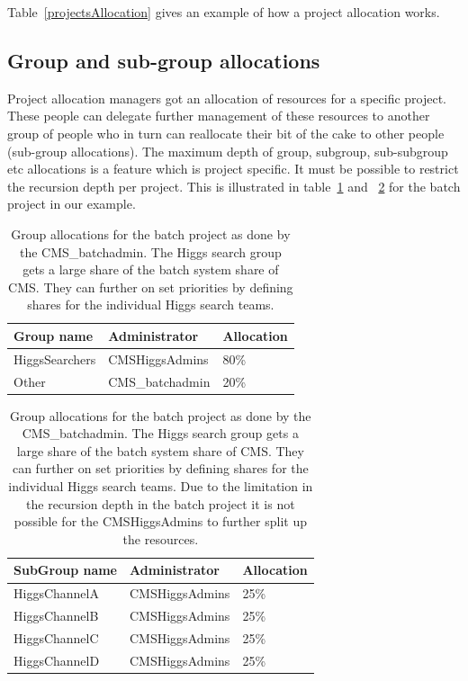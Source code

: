 Table~\ref{projectsAllocation} gives an example of how a project allocation works. 

\subsection{Group and sub-group allocations}
Project allocation managers got an allocation of resources for a specific project. These people can delegate further management of these resources to another group of people who in turn can reallocate their bit of the cake to other people (sub-group allocations). 
The maximum depth of group, subgroup, sub-subgroup etc allocations is a feature which is project specific. It must be possible to restrict the recursion depth per project. This is illustrated in table~\ref{groupAllocationForBatch} and ~\ref{subgroupAllocationForBatch} for the batch project in our example.

\begin{table}[htb]
\begin{center}
\begin{tabular}{|l|l|l|}
\hline
Group name & Administrator & Allocation \\
\hline
HiggsSearchers & CMSHiggsAdmins& 80\%\\
Other & CMS\_batchadmin & 20\%\\
\hline
\end{tabular}
\end{center}
\caption{\label{groupAllocationForBatch}Group allocations for the batch project as done by the CMS\_batchadmin. The Higgs search group gets a large share of the batch system share of CMS. They can further on set priorities by defining shares for the individual Higgs search teams.  }

\end{table}

\begin{table}
\begin{center}
\begin{tabular}{|l|l|l|}
\hline
SubGroup name & Administrator & Allocation \\
\hline
HiggsChannelA & CMSHiggsAdmins& 25\%\\
HiggsChannelB & CMSHiggsAdmins& 25\%\\
HiggsChannelC & CMSHiggsAdmins& 25\%\\
HiggsChannelD & CMSHiggsAdmins& 25\%\\
\hline
\end{tabular}
\end{center}
\caption{\label{subgroupAllocationForBatch}Group allocations for the batch project as done by the CMS\_batchadmin. The Higgs search group gets a large share of the batch system share of CMS. They can further on set priorities by defining shares for the individual Higgs search teams. Due to the limitation in the recursion depth in the batch project it is not possible for the CMSHiggsAdmins to further split up the resources. }
\end{table}

